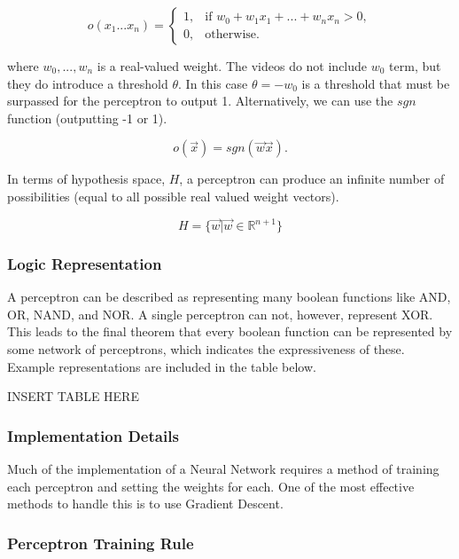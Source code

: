 \documentclass[titlepage,11pt]{article}
\begin{document}
\begin{equation}
o(x_1...x_n) =
    \begin{cases}
            1, &         \text{if } w_0+w_1x_1+...+w_nx_n>0,\\
            0, &         \text{otherwise}.
    \end{cases}
\end{equation}

where $w_0,...,w_n$ is a real-valued weight. The videos do not include $w_0$ term, but they do introduce a threshold $\theta$. In this case $\theta = -w_0$ is a threshold that must be surpassed for the perceptron to output 1. Alternatively, we can use the $sgn$ function (outputting -1 or 1).

\begin{equation}
o(\vec{x}) = sgn(\vec{w}\vec{x}).
\end{equation}

In terms of hypothesis space, $H$, a perceptron can produce an infinite number of possibilities (equal to all possible real valued weight vectors).

\begin{equation}
H =\{\vec{w} | \vec{w} \in \mathbb{R}^{n+1} \}
\end{equation}

\subsubsection*{Logic Representation}

A perceptron can be described as representing many boolean functions like AND, OR, NAND, and NOR. A single perceptron can not, however, represent XOR. This leads to the final theorem that every boolean function can be represented by some network of perceptrons, which indicates the expressiveness of these. Example representations are included in the table below.

INSERT TABLE HERE

\subsubsection{Implementation Details}

Much of the implementation of a Neural Network requires a method of training each perceptron and setting the weights for each. One of the most effective methods to handle this is to use Gradient Descent.

\subsubsection*{Perceptron Training Rule}
\end{document}
